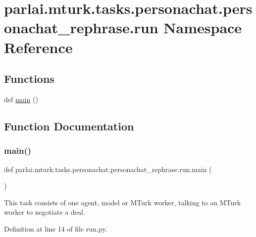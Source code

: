 \hypertarget{namespaceparlai_1_1mturk_1_1tasks_1_1personachat_1_1personachat__rephrase_1_1run}{}\section{parlai.\+mturk.\+tasks.\+personachat.\+personachat\+\_\+rephrase.\+run Namespace Reference}
\label{namespaceparlai_1_1mturk_1_1tasks_1_1personachat_1_1personachat__rephrase_1_1run}
\subsection*{Functions}
\begin{DoxyCompactItemize}
\item 
def \hyperlink{namespaceparlai_1_1mturk_1_1tasks_1_1personachat_1_1personachat__rephrase_1_1run_a91f09d955cf9e1502d8d9882fa7e1f69}{main} ()
\end{DoxyCompactItemize}


\subsection{Function Documentation}
\mbox{\label{namespaceparlai_1_1mturk_1_1tasks_1_1personachat_1_1personachat__rephrase_1_1run_a91f09d955cf9e1502d8d9882fa7e1f69}} 
\subsubsection{\texorpdfstring{main()}{main()}}
{\footnotesize\ttfamily def parlai.\+mturk.\+tasks.\+personachat.\+personachat\+\_\+rephrase.\+run.\+main (\begin{DoxyParamCaption}{ }\end{DoxyParamCaption})}

\begin{DoxyVerb}This task consists of one agent, model or MTurk worker, talking to an
MTurk worker to negotiate a deal.
\end{DoxyVerb}
 

Definition at line 14 of file run.\+py.

